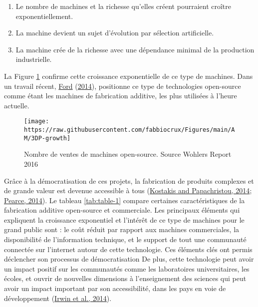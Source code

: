 \documentclass[
]{article}
\providecommand{\tightlist}{%
  \setlength{\itemsep}{0pt}\setlength{\parskip}{0pt}}
\begin{document}
\begin{enumerate}
\def\labelenumi{\arabic{enumi}.}
\tightlist
\item
  Le nombre de machines et la richesse qu'elles créent pourraient
  croître exponentiellement.
\item
  La machine devient un sujet d'évolution par sélection artificielle.
\item
  La machine crée de la richesse avec une dépendance minimal de la
  production industrielle.
\end{enumerate}

La Figure \ref{fig:3dp-growth} confirme cette croissance exponentielle de ce type de machines. Dans un travail récent, \protect\hyperlink{ref-Ford2014}{Ford} (\protect\hyperlink{ref-Ford2014}{2014}), positionne ce type de technologies open-source comme étant les machines de fabrication additive, les plus utilisées à l'heure actuelle.

\begin{figure}

{\centering \texttt{[image: https://raw.githubusercontent.com/fabbiocrux/Figures/main/AM/3DP-growth]} 

}

\caption{Nombre de ventes de machines open-source. Source Wohlers Report 2016}\label{fig:3dp-growth}
\end{figure}

Grâce à la démocratisation de ces projets, la fabrication de produits complexes et de grande valeur est devenue accessible à tous (\protect\hyperlink{ref-Kostakis2013}{Kostakis and Papachristou, 2014}; \protect\hyperlink{ref-Pearce2014k}{Pearce, 2014}).
Le tableau \ref{tab:table-1} compare certaines caractéristiques de la fabrication additive open-source et commerciale.
Les principaux éléments qui expliquent la croissance exponentiel et l'intérêt de ce type de machines pour le grand public sont : le coût réduit par rapport aux machines commerciales, la disponibilité de l'information technique, et le support de tout une communauté connectée sur l'internet autour de cette technologie.
Ces éléments clés ont permis déclencher son processus de démocratisation
De plus, cette technologie peut avoir un impact positif sur les communautés comme les laboratoires universitaires, les écoles, et ouvrir de nouvelles dimensions à l'enseignement des sciences qui peut avoir un impact important par son accessibilité, dans les pays en voie de développement (\protect\hyperlink{ref-Irwin2014}{Irwin et al., 2014}).
\end{document}
